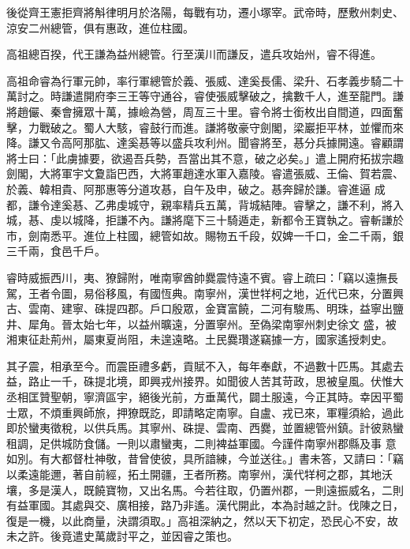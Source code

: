 \begin{pinyinscope}
 後從齊王憲拒齊將斛律明月於洛陽，每戰有功，遷小塚宰。武帝時，歷敷州刺史、涼安二州總管，俱有惠政，進位柱國。



 高祖總百揆，代王謙為益州總管。行至漢川而謙反，遣兵攻始州，睿不得進。



 高祖命睿為行軍元帥，率行軍總管於義、張威、達奚長儒、梁升、石孝義步騎二十
 萬討之。時謙遣開府李三王等守通谷，睿使張威擊破之，擒數千人，進至龍門。謙將趙儼、秦會擁眾十萬，據嶮為營，周亙三十里。睿令將士銜枚出自間道，四面奮擊，力戰破之。蜀人大駭，睿鼓行而進。謙將敬豪守劍閣，梁巖拒平林，並懼而來降。謙又令高阿那肱、達奚惎等以盛兵攻利州。聞睿將至，惎分兵據開遠。睿顧謂將士曰：「此虜據要，欲遏吾兵勢，吾當出其不意，破之必矣。」遣上開府拓拔宗趣劍閣，大將軍宇文夐詣巴西，大將軍趙達水軍入嘉陵。睿遣張威、王倫、賀若震、於義、韓相貴、阿那惠等分道攻惎，自午及申，破之。惎奔歸於謙。睿進逼
 成都，謙令達奚惎、乙弗虔城守，親率精兵五萬，背城結陣。睿擊之，謙不利，將入城，惎、虔以城降，拒謙不內。謙將麾下三十騎遁走，新都令王寶執之。睿斬謙於市，劍南悉平。進位上柱國，總管如故。賜物五千段，奴婢一千口，金二千兩，銀三千兩，食邑千戶。



 睿時威振西川，夷、獠歸附，唯南寧酋帥爨震恃遠不賓。睿上疏曰：「竊以遠撫長駕，王者令圖，易俗移風，有國恆典。南寧州，漢世䍧柯之地，近代已來，分置興古、雲南、建寧、硃提四郡。戶口殷眾，金寶富饒，二河有駿馬、明珠，益寧出鹽井、犀角。晉太始七年，以益州曠遠，分置寧州。至偽梁南寧州刺史徐文
 盛，被湘東征赴荊州，屬東夏尚阻，未遑遠略。土民爨瓚遂竊據一方，國家遙授刺史。



 其子震，相承至今。而震臣禮多虧，貢賦不入，每年奉獻，不過數十匹馬。其處去益，路止一千，硃提北境，即興戎州接界。如聞彼人苦其苛政，思被皇風。伏惟大丞相匡贊聖朝，寧濟區宇，絕後光前，方垂萬代，闢土服遠，今正其時。幸因平蜀士眾，不煩重興師旅，押獠既訖，即請略定南寧。自盧、戎已來，軍糧須給，過此即於蠻夷徵稅，以供兵馬。其寧州、硃提、雲南、西爨，並置總管州鎮。計彼熟蠻租調，足供城防食儲。一則以肅蠻夷，二則裨益軍國。今謹件南寧州郡縣及事
 意如別。有大都督杜神敬，昔曾使彼，具所諳練，今並送往。」書未答，又請曰：「竊以柔遠能邇，著自前經，拓土開疆，王者所務。南寧州，漢代䍧柯之郡，其地沃壤，多是漢人，既饒寶物，又出名馬。今若往取，仍置州郡，一則遠振威名，二則有益軍國。其處與交、廣相接，路乃非遙。漢代開此，本為討越之計。伐陳之日，復是一機，以此商量，決謂須取。」高祖深納之，然以天下初定，恐民心不安，故未之許。後竟遣史萬歲討平之，並因睿之策也。




\end{pinyinscope}
